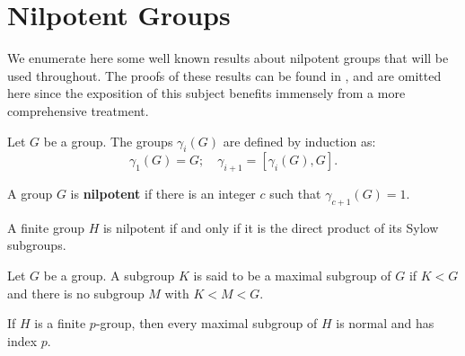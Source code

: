 \pagebreak
\section{Nilpotent Groups}

We enumerate here some well known results about nilpotent groups that will be used throughout. The proofs of these results can be found in \cite{RotmanITG}, and are omitted here since the exposition of this subject benefits immensely from a more comprehensive treatment.

\begin{definition}
    Let $G$ be a group. The groups $\gamma_i(G)$ are defined by induction as:
    $$
    \gamma_1(G) = G; \quad \gamma_{i+1} = \left[\gamma_i(G), G\right].
    $$ 
\end{definition}

\begin{definition}
    A group $G$ is \textbf{nilpotent} if there is an integer $c$ such that $\gamma_{c+1}(G) = 1$. 
\end{definition}

\begin{theorem}
    \cite[Theorem 5.39]{RotmanITG}
    A finite group $H$ is nilpotent if and only if it is the direct product of its Sylow subgroups.
\end{theorem}

\begin{definition}
    Let $G$ be a group. A subgroup $K$ is said to be a maximal subgroup of $G$ if $K < G$ and there is no subgroup $M$ with $K < M < G$.
\end{definition}

\begin{theorem}
    \cite[Theorem 5.40]{RotmanITG}
    \label{S1NG:maxsub}
    If $H$ is a finite $p$-group, then every maximal subgroup of $H$ is normal and has index $p$.
\end{theorem}

